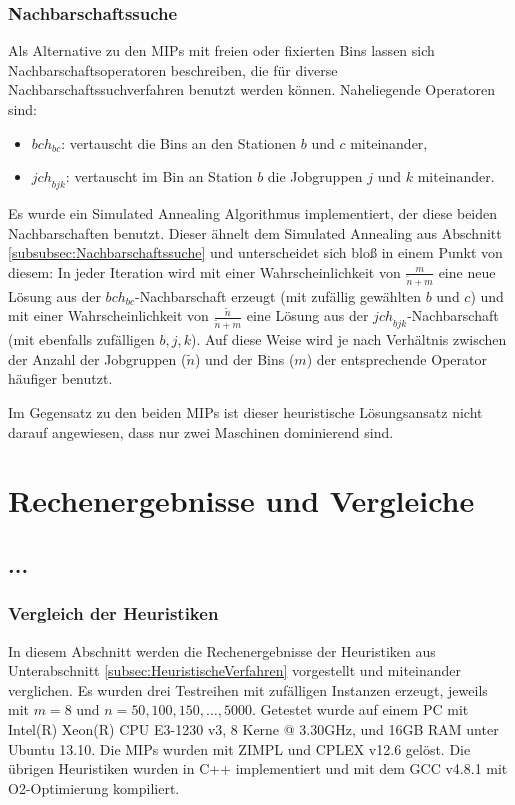\documentclass{scrreprt}
\begin{document}
\subsection{Nachbarschaftssuche}
\label{subsec:Nachbarschaftssuche}
Als Alternative zu den MIPs mit freien oder fixierten Bins lassen sich Nachbarschaftsoperatoren beschreiben, 
die für diverse Nachbarschaftssuchverfahren benutzt werden können.
Naheliegende Operatoren sind:
\begin{itemize}
    \item $\mathit{bch}_{bc}$: vertauscht die Bins an den Stationen $b$ und $c$ miteinander,
    \item $\mathit{jch}_{bjk}$: vertauscht im Bin an Station $b$ die Jobgruppen $j$ und $k$ miteinander.
\end{itemize}
Es wurde ein Simulated Annealing Algorithmus implementiert, der diese beiden Nachbarschaften benutzt.
Dieser ähnelt dem Simulated Annealing aus Abschnitt \ref{subsubsec:Nachbarschaftssuche} und unterscheidet sich bloß in einem Punkt von diesem:
In jeder Iteration wird mit einer Wahrscheinlichkeit von $\frac{m}{\tilde{n}+m}$ eine neue Lösung aus der $\mathit{bch}_{bc}$-Nachbarschaft erzeugt 
(mit zufällig gewählten $b$ und $c$) und mit einer Wahrscheinlichkeit von $\frac{\tilde{n}}{\tilde{n}+m}$ eine Lösung aus der $\mathit{jch}_{bjk}$-Nachbarschaft
(mit ebenfalls zufälligen $b,j,k$).
Auf diese Weise wird je nach Verhältnis zwischen der Anzahl der Jobgruppen ($\tilde{n}$) und der Bins ($m$) der entsprechende Operator häufiger benutzt.

Im Gegensatz zu den beiden MIPs ist dieser heuristische Lösungsansatz nicht darauf angewiesen, dass nur zwei Maschinen dominierend sind.


\chapter{Rechenergebnisse und Vergleiche}
\label{chap:RechenergebnisseUndVergleiche}

\section{...}

\subsection{Vergleich der Heuristiken}
\label{subsec:VergleichDerHeuristiken}
In diesem Abschnitt werden die Rechenergebnisse der Heuristiken aus Unterabschnitt \ref{subsec:HeuristischeVerfahren} vorgestellt und miteinander verglichen.
Es wurden drei Testreihen mit zufälligen Instanzen erzeugt, jeweils mit $m=8$ und $n=50,100,150,\ldots,5000$.
Getestet wurde auf einem PC mit Intel(R) Xeon(R) CPU E3-1230 v3, 8 Kerne @ 3.30GHz, und 16GB RAM unter Ubuntu 13.10.
Die MIPs wurden mit ZIMPL \cite{Koch2004} und CPLEX v12.6 gelöst.
Die übrigen Heuristiken wurden in C++ implementiert und mit dem GCC v4.8.1 mit O2-Optimierung kompiliert.
\end{document}
